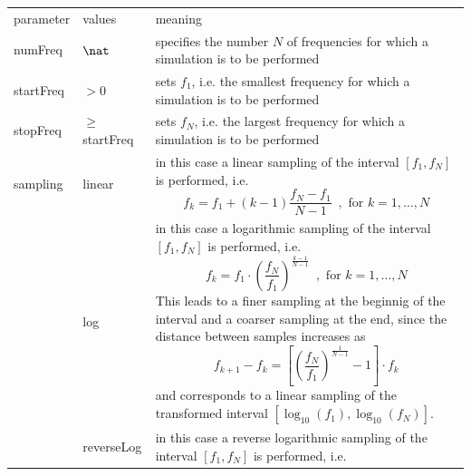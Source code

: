 \begin{center}
\begin{longtable}{llp{}}
\hline\noalign{\smallskip}
parameter & values & meaning \\
\noalign{\smallskip}\hline\noalign{\smallskip}
numFreq & $\nat$ & specifies the number $N$ of frequencies for which
                   a simulation is to be performed\\
\noalign{\smallskip}\hline\noalign{\smallskip}
startFreq & $> 0$ & sets $f_1$, i.e. the smallest frequency for which a
                    simulation is to be performed\\
\noalign{\smallskip}\hline\noalign{\smallskip}
stopFreq & $\geqslant$ startFreq & sets $f_N$, i.e. the largest frequency for
                                   which a simulation is to be performed\\
\noalign{\smallskip}\hline\noalign{\smallskip}
sampling & linear & in this case a linear sampling of the interval
                    $[f_1,f_N]$ is performed, i.e.
                    \begin{displaymath}
                    f_k = f_1 + (k-1) \frac{f_N - f_1}{N-1}
                    \enspace,\mbox{ for } k = 1,\ldots,N
                    \end{displaymath}\\
         & log    & in this case a logarithmic sampling of the interval
                    $[f_1,f_N]$ is performed, i.e.
                    \begin{displaymath}
                    f_k = f_1 \cdot
                    \left(\frac{f_N}{f_1}\right)^{\frac{k-1}{N-1}}
                    \enspace,\mbox{ for } k = 1,\ldots,N
                    \end{displaymath}
                    This leads to a finer sampling at the beginnig of the
                    interval and a coarser sampling at the end, since the
                    distance between samples increases as
                    \begin{displaymath}
                    f_{k+1} - f_k = \left[
                    \left(\frac{f_N}{f_1}\right)^{\frac{1}{N-1}}
                    - 1 \right] \cdot f_k
                    \end{displaymath}
	            and corresponds to a linear sampling of the transformed
                    interval $[\log_{10}(f_1),\log_{10}(f_N)]$.\\[1ex]
         & reverseLog & in this case a reverse logarithmic sampling of the
                        interval $[f_1,f_N]$ is performed, i.e.

\end{longtable}
\end{center}
